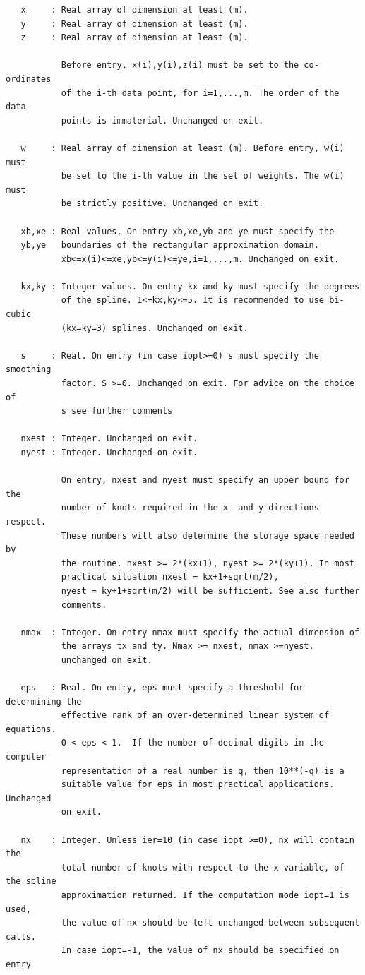 \documentclass[11pt,twoside]{article}
\begin{document}
\begin{verbatim}
   x     : Real array of dimension at least (m).
   y     : Real array of dimension at least (m).
   z     : Real array of dimension at least (m).

           Before entry, x(i),y(i),z(i) must be set to the co-ordinates
           of the i-th data point, for i=1,...,m. The order of the data
           points is immaterial. Unchanged on exit.

   w     : Real array of dimension at least (m). Before entry, w(i) must
           be set to the i-th value in the set of weights. The w(i) must
           be strictly positive. Unchanged on exit.

   xb,xe : Real values. On entry xb,xe,yb and ye must specify the
   yb,ye   boundaries of the rectangular approximation domain.
           xb<=x(i)<=xe,yb<=y(i)<=ye,i=1,...,m. Unchanged on exit.

   kx,ky : Integer values. On entry kx and ky must specify the degrees
           of the spline. 1<=kx,ky<=5. It is recommended to use bi-cubic
           (kx=ky=3) splines. Unchanged on exit.

   s     : Real. On entry (in case iopt>=0) s must specify the smoothing
           factor. S >=0. Unchanged on exit. For advice on the choice of
           s see further comments

   nxest : Integer. Unchanged on exit.
   nyest : Integer. Unchanged on exit.

           On entry, nxest and nyest must specify an upper bound for the
           number of knots required in the x- and y-directions respect.
           These numbers will also determine the storage space needed by
           the routine. nxest >= 2*(kx+1), nyest >= 2*(ky+1). In most
           practical situation nxest = kx+1+sqrt(m/2),
           nyest = ky+1+sqrt(m/2) will be sufficient. See also further
           comments.

   nmax  : Integer. On entry nmax must specify the actual dimension of
           the arrays tx and ty. Nmax >= nxest, nmax >=nyest.
           unchanged on exit.

   eps   : Real. On entry, eps must specify a threshold for determining the
           effective rank of an over-determined linear system of equations.
           0 < eps < 1.  If the number of decimal digits in the computer
           representation of a real number is q, then 10**(-q) is a
           suitable value for eps in most practical applications. Unchanged
           on exit.

   nx    : Integer. Unless ier=10 (in case iopt >=0), nx will contain the
           total number of knots with respect to the x-variable, of the spline
           approximation returned. If the computation mode iopt=1 is used,
           the value of nx should be left unchanged between subsequent calls.
           In case iopt=-1, the value of nx should be specified on entry


\end{verbatim}
\end{document}
